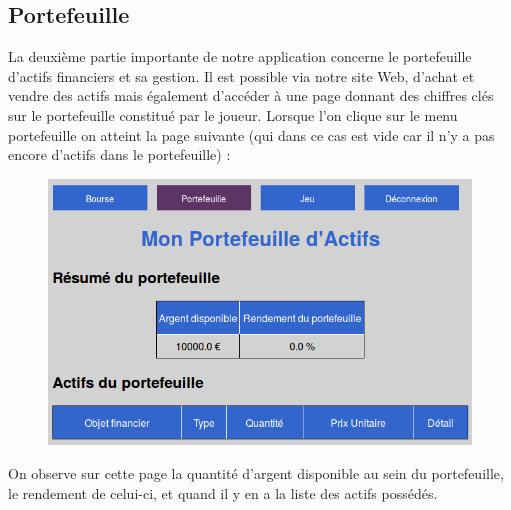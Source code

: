     \subsection{Portefeuille}
    La deuxième partie importante de notre application concerne le portefeuille d'actifs financiers et sa gestion. Il est possible via notre site Web, d'achat et vendre des actifs mais également d'accéder à une page donnant des chiffres clés sur le portefeuille constitué par le joueur. Lorsque l'on clique sur le menu portefeuille on atteint la page suivante (qui dans ce cas est vide car il n'y a pas encore d'actifs dans le portefeuille) :\\
    \begin{figure}[H]
      \center
      \includegraphics[scale=0.5]{../graph/7-accueilportefeuillevide.png}
    \end{figure}
    On observe sur cette page la quantité d'argent disponible au sein du portefeuille, le rendement de celui-ci, et quand il y en a la liste des actifs possédés.
      

